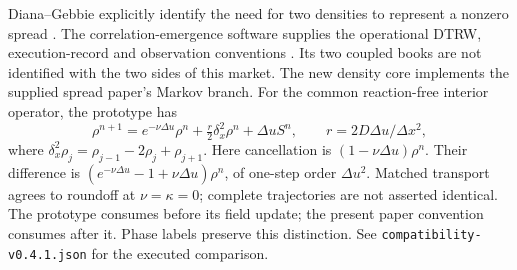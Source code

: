 \documentclass[11pt,a4paper]{article}
\newcommand{\du}{\Delta u}\newcommand{\dx}{\Delta x}
\newcommand{\lap}{\delta_x^2}
\begin{document}
Diana--Gebbie explicitly identify the need for two densities to represent a
nonzero spread \cite{cam}. The correlation-emergence software supplies the
operational DTRW, execution-record and observation conventions \cite{ag,code}.
Its two coupled books are not identified with the two sides of this market.
The new density core implements the supplied spread paper's Markov branch.
For the common reaction-free interior operator, the prototype has
\[
 \rho^{n+1}=e^{-\nu\du}\rho^n+\tfrac r2\lap\rho^n+\du S^n,
 \qquad r=2D\du/\dx^2,
\]
where $\lap\rho_j=\rho_{j-1}-2\rho_j+\rho_{j+1}$. Here cancellation is
$(1-\nu\du)\rho^n$. Their difference is
$(e^{-\nu\du}-1+\nu\du)\rho^n$, of one-step order $\du^2$.
Matched transport agrees to roundoff at $\nu=\kappa=0$; complete trajectories
are not asserted identical. The prototype consumes before its field update;
the present paper convention consumes after it. Phase labels preserve this
distinction. See \texttt{compatibility-v0.4.1.json} for the executed comparison.

\newpage
\end{document}
